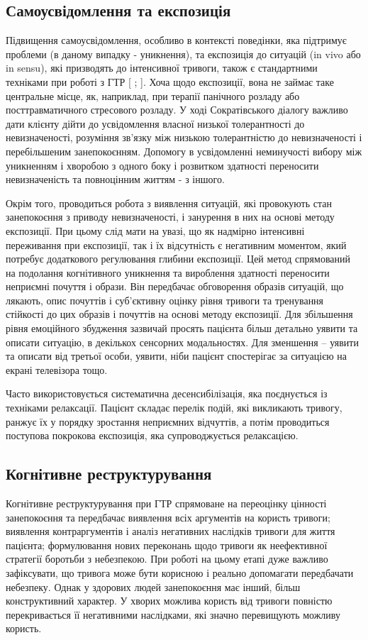 \subsection {Самоусвідомлення та експозиція}
Підвищення самоусвідомлення, особливо в контексті поведінки, яка підтримує проблеми (в даному випадку - уникнення), та експозиція до ситуацій (in vivo або in sensu), які призводять до інтенсивної тривоги, також є стандартними техніками при роботі з ГТР [
\cite{bib17};
\cite{bib18}].  Хоча щодо експозиції, вона не займає таке центральне місце, як, наприклад, при терапії панічного розладу або посттравматичного стресового розладу. У ході Сократівського діалогу важливо дати клієнту дійти до усвідомлення власної низької толерантності до невизначеності, розуміння зв'язку між низькою толерантністю до невизначеності і перебільшеним занепокоєнням. Допомогу в усвідомленні неминучості вибору між уникненням і хворобою з одного боку і розвитком здатності переносити невизначеність та повноцінним життям - з іншого.

Окрім того, проводиться робота з виявлення ситуацій, які провокують стан занепокоєння з приводу невизначеності, і занурення в них на основі методу експозиції. При цьому слід мати на увазі, що як надмірно інтенсивні переживання при експозиції, так і їх відсутність є негативним моментом, який потребує додаткового регулювання глибини експозиції. Цей метод спрямований на подолання когнітивного уникнення та вироблення здатності переносити неприємні почуття і образи. Він передбачає обговорення образів ситуацій, що лякають, опис почуттів і суб'єктивну оцінку рівня тривоги та тренування стійкості до цих образів і почуттів на основі методу експозиції. Для збільшення рівня емоційного збудження зазвичай просять пацієнта більш детально уявити та описати ситуацію, в декількох сенсорних модальностях. Для зменшення – уявити та описати від третьої особи, уявити, ніби пацієнт спостерігає за ситуацією на екрані телевізора тощо.

Часто використовується систематична десенсибілізація, яка поєднується із техніками релаксації. Пацієнт складає перелік подій, які викликають тривогу, ранжує їх у порядку зростання неприємних відчуттів, а потім проводиться поступова покрокова експозиція, яка супроводжується релаксацією.

\subsection {Когнітивне реструктурування}
Когнітивне реструктурування при ГТР спрямоване на переоцінку цінності занепокоєння та передбачає  виявлення всіх аргументів на користь тривоги; виявлення контраргументів і аналіз негативних наслідків тривоги для життя пацієнта; формулювання нових переконань щодо тривоги як неефективної стратегії боротьби з небезпекою. При роботі на цьому етапі дуже важливо зафіксувати, що тривога може бути корисною і реально допомагати передбачати небезпеку. Однак у здорових людей занепокоєння має інший, більш конструктивний характер. У хворих можлива користь від тривоги повністю перекривається її негативними наслідками, які значно перевищують можливу користь.


